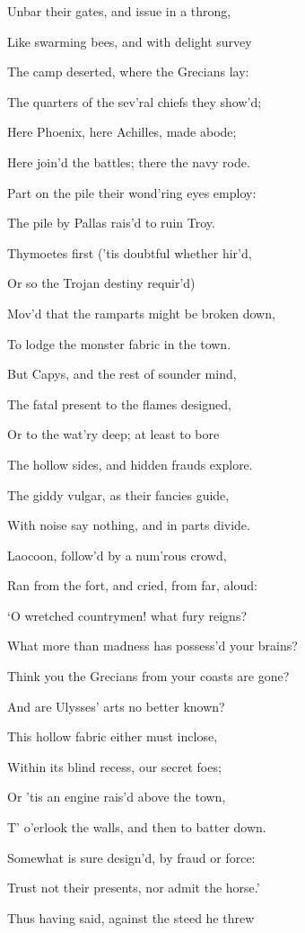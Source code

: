 Unbar their gates, and issue in a throng,

Like swarming bees, and with delight survey

The camp deserted, where the Grecians lay:

The quarters of the sev’ral chiefs they show’d;

Here Phoenix, here Achilles, made abode;

Here join’d the battles; there the navy rode.

Part on the pile their wond’ring eyes employ:

The pile by Pallas rais’d to ruin Troy.

Thymoetes first (’tis doubtful whether hir’d,

Or so the Trojan destiny requir’d)

Mov’d that the ramparts might be broken down,

To lodge the monster fabric in the town.

But Capys, and the rest of sounder mind,

The fatal present to the flames designed,

Or to the wat’ry deep; at least to bore

The hollow sides, and hidden frauds explore.

The giddy vulgar, as their fancies guide,

With noise say nothing, and in parts divide.

Laocoon, follow’d by a num’rous crowd,

Ran from the fort, and cried, from far, aloud:

‘O wretched countrymen! what fury reigns?

What more than madness has possess’d your brains?

Think you the Grecians from your coasts are gone?

And are Ulysses’ arts no better known?

This hollow fabric either must inclose,

Within its blind recess, our secret foes;

Or ’tis an engine rais’d above the town,

T’ o’erlook the walls, and then to batter down.

Somewhat is sure design’d, by fraud or force:

Trust not their presents, nor admit the horse.’

Thus having said, against the steed he threw

